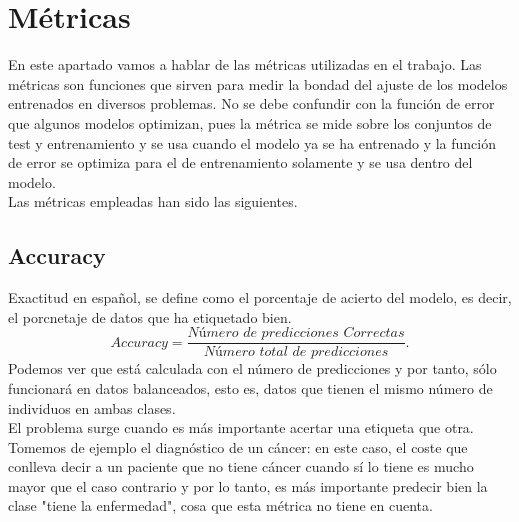 \section{Métricas}
En este apartado vamos a hablar de las métricas utilizadas en el trabajo. Las métricas son funciones que sirven para medir la bondad del ajuste de los modelos entrenados en diversos problemas. No se debe confundir con la función de error que algunos modelos optimizan, pues la métrica se mide sobre los conjuntos de test y entrenamiento y se usa cuando el modelo ya se ha entrenado y la función de error se optimiza para el de entrenamiento solamente y se usa dentro del modelo.\\
Las métricas empleadas han sido las siguientes.
\subsection{Accuracy}
Exactitud en español, se define como el porcentaje de acierto del modelo, es decir, el porcnetaje de datos que ha etiquetado bien.
\[ Accuracy=\frac{\textit{Número de predicciones Correctas}}{\textit{Número total de predicciones}}. \]
Podemos ver que está calculada con el número de predicciones y por tanto, sólo funcionará en datos balanceados, esto es, datos que tienen el mismo número de individuos en ambas clases.\\
El problema surge cuando es más importante acertar una etiqueta que otra. Tomemos de ejemplo el diagnóstico de un cáncer: en este caso, el coste que conlleva decir a un paciente que no tiene cáncer cuando sí lo tiene es mucho mayor que el caso contrario y por lo tanto, es más importante predecir bien la clase "tiene la enfermedad", cosa que esta métrica no tiene en cuenta.
